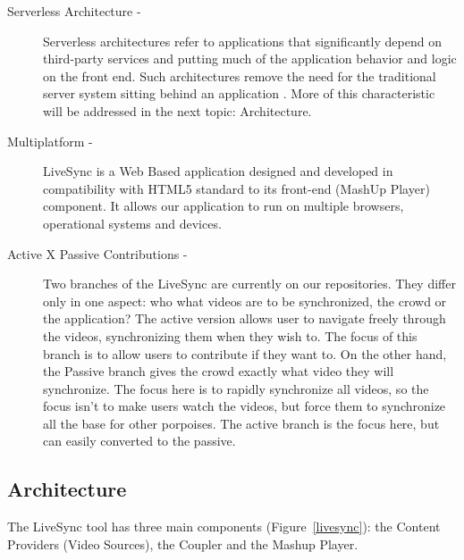 \documentclass{sig-alternate-05-2015}
\begin{document}
\begin{description}
	\item[Serverless Architecture -] Serverless architectures refer to applications that significantly depend on third-party services and putting much of the application behavior and logic on the front end. Such architectures remove the need for the traditional server system sitting behind an application \cite{RobertServerless}. More of this characteristic will be addressed in the next topic: Architecture.
	
	\item[Multiplatform -] LiveSync is a Web Based application designed and developed in compatibility with HTML5 standard to its front-end (MashUp Player) component. It allows our application to run on multiple browsers, operational systems and devices.
	
	\item[Active X Passive Contributions -] Two branches of the LiveSync are currently on our repositories. They differ only in one aspect: who what videos are to be synchronized, the crowd or the application? The active version allows user to navigate freely through the videos, synchronizing them when they wish to. The focus of this branch is to allow users to contribute if they want to. On the other hand, the Passive branch gives the crowd exactly what video they will synchronize. The focus here is to rapidly synchronize all videos, so the focus isn't to make users watch the videos, but force them to synchronize all the base for other porpoises. The active branch is the focus here, but can easily converted to the passive.
	
\end{description}

\subsection{Architecture}
The LiveSync tool has three main components (Figure~\ref{livesync}): the Content Providers (Video Sources), the Coupler and the Mashup Player.
\end{document}
